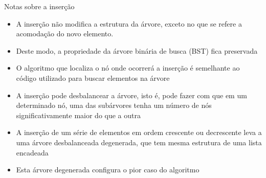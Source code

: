 \begin{frame}[fragile]{Notas sobre a inserção}

	\begin{itemize}
		\item A inserção { não} modifica a estrutura da árvore, { exceto} no que se refere a acomodação do novo elemento.

        \item Deste modo, a propriedade da árvore binária de busca (BST) fica preservada  

		\item O algoritmo que localiza o nó onde ocorrerá a inserção é semelhante ao código 
            utilizado para buscar elementos na árvore

		\item A inserção pode desbalancear a árvore, isto é, pode fazer com que em um determinado 
            nó, uma das 
            subárvores tenha um número de nós significativamente maior do que a outra

        \item A inserção de um série de elementos em ordem crescente ou decrescente leva a 
            uma árvore desbalanceada degenerada, que tem mesma estrutura de uma lista encadeada

        \item Esta árvore degenerada configura o pior caso do algoritmo
	\end{itemize}

\end{frame}
